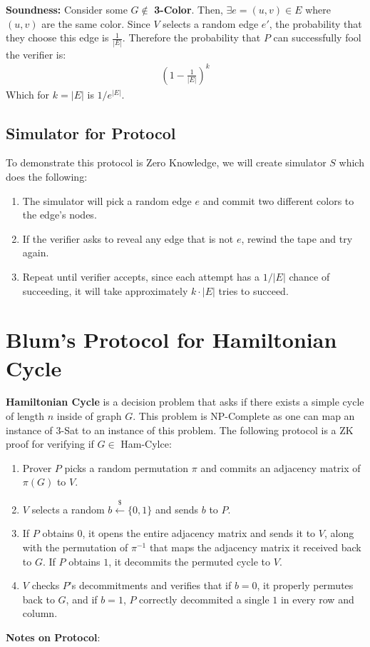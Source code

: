 \documentclass[11pt]{article}
\begin{document}
\textbf{Soundness:} Consider some $G \notin $ \textbf{3-Color}. Then, $\exists e = (u,v) \in E$ where $(u,v)$ are the same color. Since $V$ selects a random edge $e'$, the probability that they choose this edge is $\frac{1}{|E|}$. Therefore the probability that $P$ can successfully fool the verifier is:
\begin{align*}
    (1-\frac{1}{|E|})^k
\end{align*}
Which for $k = |E|$ is $1/e^{|E|}$.

\subsection{Simulator for Protocol}
To demonstrate this protocol is Zero Knowledge, we will create simulator $S$ which does the following:
\begin{enumerate}
    \item The simulator will pick a random edge $e$ and commit two different colors to the edge's nodes.
    \item If the verifier asks to reveal any edge that is not $e$, rewind the tape and try again.
    \item Repeat until verifier accepts, since each attempt has a $1/|E|$ chance of succeeding, it will take approximately $k \cdot |E|$ tries to succeed. 
\end{enumerate}

\section{Blum's Protocol for Hamiltonian Cycle}
\textbf{Hamiltonian Cycle} is a decision problem that asks if there exists a simple cycle of length $n$ inside of graph $G$. This problem is NP-Complete as one can map an instance of $3$-Sat to an instance of this problem. The following protocol is a ZK proof for verifying if $G \in $ Ham-Cylce:
\begin{enumerate}
    \item Prover $P$ picks a random permutation $\pi$ and commits an adjacency matrix of $\pi(G)$ to $V$.
    \item $V$ selects a random $b \overset{\$}{\leftarrow} \{0,1\}$ and sends $b$ to $P$.
    \item If $P$ obtains $0$, it opens the entire adjacency matrix and sends it to $V$, along with the permutation of $\pi^{-1}$ that maps the adjacency matrix it received back to $G$. If $P$ obtains $1$, it decommits the permuted cycle to $V$.
    \item $V$ checks $P$'s decommitments and verifies that if $b=0$, it properly permutes back to $G$, and if $b=1$, $P$ correctly decommited a single $1$ in every row and column.
\end{enumerate}
\textbf{Notes on Protocol}:
\end{document}
